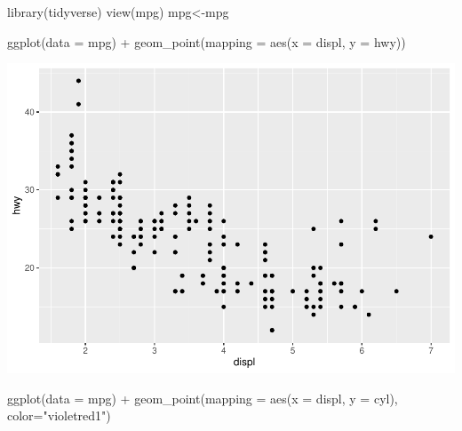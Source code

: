 \documentclass[
]{article}
\newenvironment{Shaded}{\begin{snugshade}}{\end{snugshade}}
\newcommand{\AttributeTok}[1]{\textcolor[rgb]{0.77,0.63,0.00}{#1}}
\newcommand{\FunctionTok}[1]{\textcolor[rgb]{0.00,0.00,0.00}{#1}}
\newcommand{\NormalTok}[1]{#1}
\newcommand{\OtherTok}[1]{\textcolor[rgb]{0.56,0.35,0.01}{#1}}
\newcommand{\SpecialCharTok}[1]{\textcolor[rgb]{0.00,0.00,0.00}{#1}}
\newcommand{\StringTok}[1]{\textcolor[rgb]{0.31,0.60,0.02}{#1}}
\begin{document}
\begin{Shaded}
\begin{Highlighting}[]
\FunctionTok{library}\NormalTok{(tidyverse)}
\FunctionTok{view}\NormalTok{(mpg)}
\NormalTok{mpg}\OtherTok{\textless{}{-}}\NormalTok{mpg}
\end{Highlighting}
\end{Shaded}

\begin{Shaded}
\begin{Highlighting}[]
\FunctionTok{ggplot}\NormalTok{(}\AttributeTok{data =}\NormalTok{ mpg) }\SpecialCharTok{+} 
  \FunctionTok{geom\_point}\NormalTok{(}\AttributeTok{mapping =} \FunctionTok{aes}\NormalTok{(}\AttributeTok{x =}\NormalTok{ displ, }\AttributeTok{y =}\NormalTok{ hwy)) }
\end{Highlighting}
\end{Shaded}

\includegraphics{2_9_LiveCoding_files/figure-latex/unnamed-chunk-4-1.pdf}

\begin{Shaded}
\begin{Highlighting}[]
\FunctionTok{ggplot}\NormalTok{(}\AttributeTok{data =}\NormalTok{ mpg) }\SpecialCharTok{+} 
  \FunctionTok{geom\_point}\NormalTok{(}\AttributeTok{mapping =} \FunctionTok{aes}\NormalTok{(}\AttributeTok{x =}\NormalTok{ displ, }\AttributeTok{y =}\NormalTok{ cyl), }\AttributeTok{color=}\StringTok{"violetred1"}\NormalTok{) }
\end{Highlighting}
\end{Shaded}
\end{document}
